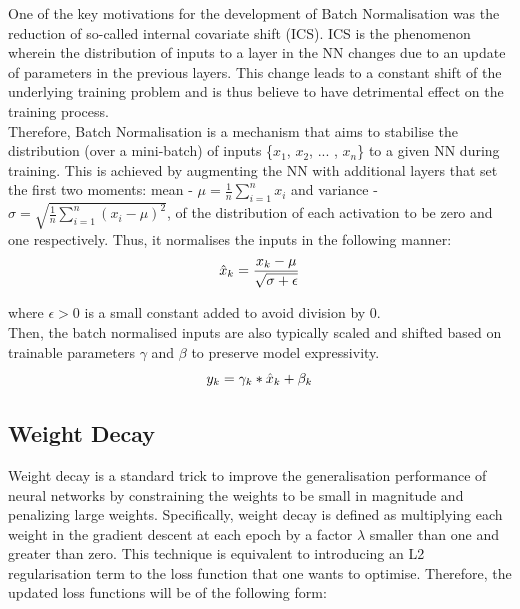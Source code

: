One of the key motivations for the development of Batch Normalisation was the reduction of so-called internal covariate shift (ICS). ICS is the phenomenon wherein the distribution of inputs to a layer in the NN changes due to an update of parameters in the previous layers. This change leads to a constant shift of the underlying training problem and is thus believe to have detrimental effect on the training process. \\

Therefore, Batch Normalisation is a mechanism that aims to stabilise the distribution (over a mini-batch) of inputs \{$x_1$, $x_2$, ... , $x_n$\} to a given NN during training. This is achieved by augmenting the NN with additional layers that set the first two moments: mean - $\mu = \frac{1}{n} \sum_{i=1}^n x_i$ and variance - $\sigma = \sqrt{\frac{1}{n} \sum_{i=1}^n (x_i - \mu) ^ 2}$, of the distribution of each activation to be zero and one respectively. Thus, it normalises the inputs in the following manner: \\

\begin{equation}
  \centering
  \hat{x}_k = \frac{x_k - \mu}{\sqrt{\sigma + \epsilon}}
\end{equation}

where $\epsilon > 0$ is a small constant added to avoid division by 0. \\

Then, the batch normalised inputs are also typically scaled and shifted based on trainable parameters $\gamma$ and $\beta$ to preserve model expressivity. \\

\begin{equation}
  \centering
  y_k = \gamma_k * \hat{x}_k + \beta_k
\end{equation}

\subsection{Weight Decay}
Weight decay is a standard trick to improve the generalisation performance of neural
networks by constraining the weights to be small in magnitude and penalizing large weights. Specifically, weight decay is defined as multiplying each weight in the gradient descent at each epoch by a factor $\lambda$ smaller than one and greater than zero. This technique is equivalent to introducing an L2 regularisation term to the loss function that one wants to optimise. Therefore, the updated loss functions will be of the following form: \\

